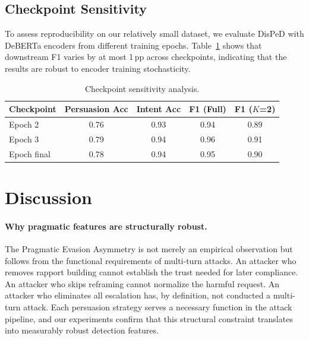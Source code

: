 \documentclass[11pt,a4paper]{article}
\begin{document}
\subsection{Checkpoint Sensitivity}
\label{sec:checkpoint}

To assess reproducibility on our relatively small dataset, we evaluate DisPeD with DeBERTa encoders from different training epochs. Table~\ref{tab:checkpoint} shows that downstream F1 varies by at most 1\,pp across checkpoints, indicating that the results are robust to encoder training stochasticity.

\begin{table}[t]
\centering
\caption{Checkpoint sensitivity analysis.}
\label{tab:checkpoint}
\begin{tabular}{lcccc}
\toprule
\textbf{Checkpoint} & \textbf{Persuasion Acc} & \textbf{Intent Acc} & \textbf{F1 (Full)} & \textbf{F1 ($K$=2)} \\
\midrule
Epoch 2 & 0.76 & 0.93 & 0.94 & 0.89 \\
Epoch 3 & 0.79 & 0.94 & 0.96 & 0.91 \\
Epoch final & 0.78 & 0.94 & 0.95 & 0.90 \\
\bottomrule
\end{tabular}
\end{table}

\section{Discussion}

\paragraph{Why pragmatic features are structurally robust.}
The Pragmatic Evasion Asymmetry is not merely an empirical observation but follows from the functional requirements of multi-turn attacks. An attacker who removes rapport building cannot establish the trust needed for later compliance. An attacker who skips reframing cannot normalize the harmful request. An attacker who eliminates all escalation has, by definition, not conducted a multi-turn attack. Each persuasion strategy serves a necessary function in the attack pipeline, and our experiments confirm that this structural constraint translates into measurably robust detection features.
\end{document}
